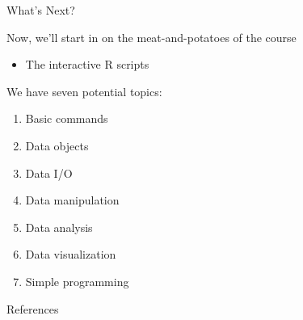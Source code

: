 \documentclass[10pt]{beamer}
\begin{document}

\begin{frame}{What's Next?}

  Now, we'll start in on the meat-and-potatoes of the course
  \begin{itemize}
  \item The interactive R scripts
  \end{itemize}
  \vb
  We have seven potential topics:
  \begin{enumerate}
  \item Basic commands
  \item Data objects
  \item Data I/O
  \item Data manipulation
  \item Data analysis
  \item Data visualization
  \item Simple programming
  \end{enumerate}
  
\end{frame}


\begin{frame}[allowframebreaks]{References}
  
  
\end{frame}

\end{document}
